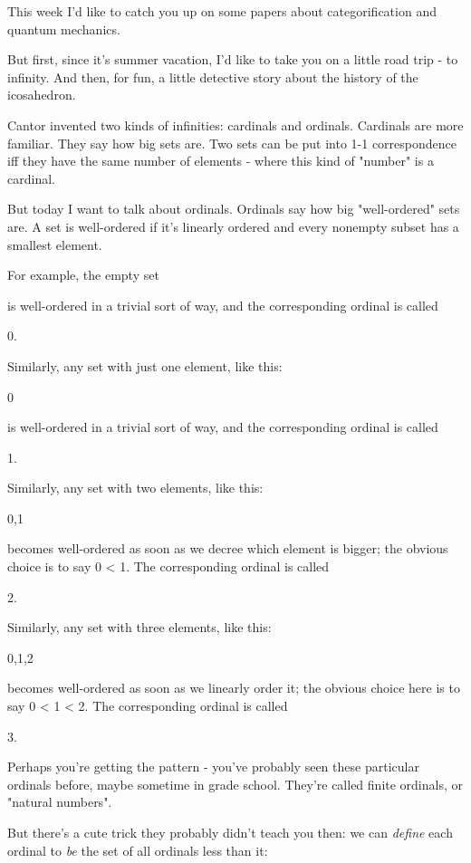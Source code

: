 

 
This week I'd like to catch you up on some papers about 
categorification and quantum mechanics.  

But first, since it's summer vacation, I'd like to take you on
a little road trip - to infinity.  And then, for fun, a little
detective story about the history of the icosahedron.

Cantor invented two kinds of infinities: cardinals and ordinals.  
Cardinals are more familiar.  They say how big sets are.  Two sets 
can be put into 1-1 correspondence iff they have the same number of 
elements - where this kind of "number" is a cardinal.  

But today I want to talk about ordinals.  Ordinals say how big 
"well-ordered" sets are.  A set is well-ordered if it's linearly 
ordered and every nonempty subset has a smallest element.  

For example, the empty set

{}

is well-ordered in a trivial sort of way, and the corresponding 
ordinal is called 

0.

Similarly, any set with just one element, like this:

{0}

is well-ordered in a trivial sort of way, and the corresponding 
ordinal is called

1.

Similarly, any set with two elements, like this:

{0,1}

becomes well-ordered as soon as we decree which element is bigger; 
the obvious choice is to say 0 < 1.  The corresponding ordinal is 
called 

2.  

Similarly, any set with three elements, like this:

{0,1,2}

becomes well-ordered as soon as we linearly order it; the obvious
choice here is to say 0 < 1 < 2.  The corresponding ordinal is called

3.  

Perhaps you're getting the pattern - you've probably seen these 
particular ordinals before, maybe sometime in grade school.  
They're called finite ordinals, or "natural numbers".

But there's a cute trick they probably didn't teach you then: we can
\emph{define} each ordinal to \emph{be} the set of all ordinals
less than it:

